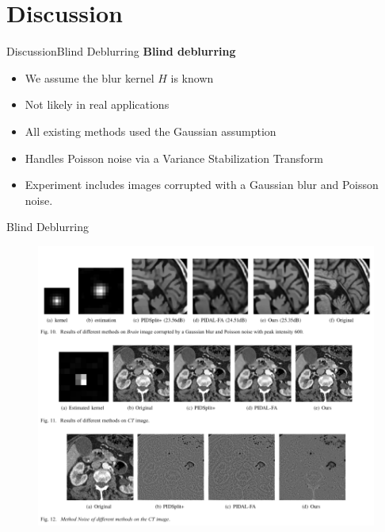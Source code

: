 \documentclass{beamer}
\begin{document}





\section{Discussion}
\begin{frame}[t]{Discussion}{Blind Deblurring}
\textbf{Blind deblurring}\\
\begin{itemize}
    \item We assume the blur kernel $H$ is known
    \item Not likely in real applications
    \item All existing methods used the Gaussian assumption
    \item Handles Poisson noise via a Variance Stabilization Transform
    \item Experiment includes images corrupted with a Gaussian blur and Poisson noise.
\end{itemize}
\end{frame}

\begin{frame}{Blind Deblurring}

\begin{figure}
    \centering
    \includegraphics[scale = 0.45]{result_sec2.png}
    \caption{}
\end{figure}
    
\end{frame}
\end{document}
